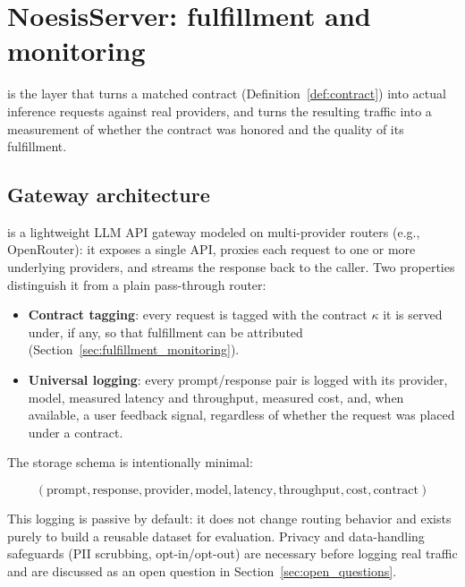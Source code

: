 \section{NoesisServer: fulfillment and monitoring}
\label{sec:noesis_server}

\NoesisServer{} is the layer that turns a matched contract
(Definition~\ref{def:contract}) into actual inference requests against real
providers, and turns the resulting traffic into a measurement of whether the
contract was honored and the quality of its fulfillment.

\subsection{Gateway architecture}
\label{sec:gateway_architecture}

\NoesisServer{} is a lightweight LLM API gateway modeled on
multi-provider routers (e.g., OpenRouter): it exposes a single API,
proxies each request to one or more underlying providers, and streams the
response back to the caller. Two properties distinguish it from a plain
pass-through router:

\begin{itemize}
  \item \textbf{Contract tagging}: every request is tagged with the contract
    $\kappa$ it is served under, if any, so that fulfillment can be attributed
    (Section~\ref{sec:fulfillment_monitoring}).
  \item \textbf{Universal logging}: every prompt/response pair is logged with
    its provider, model, measured latency and throughput, measured cost, and,
    when available, a user feedback signal, regardless of whether the request
    was placed under a contract.
\end{itemize}

The storage schema is intentionally minimal:

$$
  (\text{prompt}, \text{response}, \text{provider}, \text{model},
   \text{latency}, \text{throughput}, \text{cost}, \text{contract})
$$

This logging is passive by default: it does not change routing behavior and
exists purely to build a reusable dataset for evaluation. Privacy and
data-handling safeguards (PII scrubbing, opt-in/opt-out) are necessary before
logging real traffic and are discussed as an open question in
Section~\ref{sec:open_questions}.

